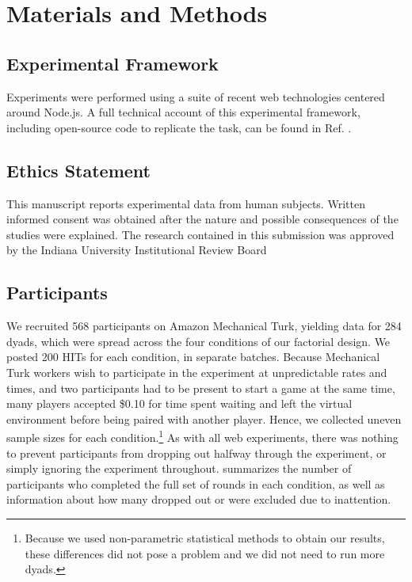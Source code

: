 \documentclass[10pt,letterpaper]{article}
\begin{document}
\section*{Materials and Methods}

\subsection*{Experimental Framework}
Experiments were performed  using a suite of recent web technologies centered around Node.js. A full technical account of this experimental framework, including open-source code to replicate the task, can be found in Ref. \cite{Hawkins15_RealTimeWebExperiments}. 

\subsection*{Ethics Statement}
This manuscript reports experimental data from human subjects. Written informed consent was obtained after the nature and possible consequences of the studies were explained. The research contained in this submission was approved by the Indiana University Institutional Review Board

\subsection*{Participants}
We recruited 568 participants on Amazon Mechanical Turk, yielding data for 284 dyads, which were spread across the four conditions of our factorial design. We posted 200 HITs for each condition, in separate batches. Because Mechanical Turk workers wish to participate in the experiment at unpredictable rates and times, and two participants had to be present to start a game at the same time, many players accepted \$0.10 for time spent waiting and left the virtual environment before being paired with another player. Hence, we collected uneven sample sizes for each condition.\footnote{Because we used non-parametric statistical methods to obtain our results, these differences did not pose a problem and we did not need to run more dyads.} As with all web experiments, there was nothing to prevent participants from dropping out halfway through the experiment, or simply ignoring the experiment throughout.  summarizes the number of participants who completed the full set of rounds in each condition, as well as information about how many dropped out or were excluded due to inattention. 
\end{document}
